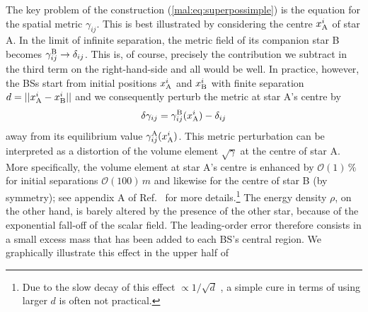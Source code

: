 The key problem of the construction (\ref{mal:eq:superpossimple})
is the equation for the spatial metric $\gamma_{ij}$. This is best
illustrated by considering the centre $x_{\rm A}^i$ of star A.
In the limit of infinite separation, the metric field of its
companion star B becomes $\gamma_{ij}^{\rm B}\rightarrow \delta_{ij}$.
This is, of course, precisely the contribution we subtract in
the third term on the right-hand-side and all would be well.
In practice, however, the BSs start from initial positions
$x_{\rm A}^i$ and $x_{\rm B}^i$ with finite separation
$d=||x_{\rm A}^i-x_{\rm B}^i||$ and we consequently perturb
the metric at star A's centre by
%
\begin{equation}
  \delta \gamma_{ij} = \gamma_{ij}^{\rm B}(x^i_{\rm A})
  -\delta_{ij}
  \label{mal:eq:metricpert}
\end{equation}
%
away from its equilibrium value $\gamma_{ij}^{\rm A}(x_{\rm A}^i)$.
This metric perturbation can be interpreted as a distortion of
the volume element $\sqrt{\gamma}$
at the centre of star A. More specifically, the volume element
at star A's centre is enhanced by $\mathcal{O}(1)\,\%$ for initial
separations $\mathcal{O}(100)\,m$ and likewise for the centre of
star B (by symmetry); see appendix A of Ref.~\cite{Helfer:2018vtq}
for more details.\footnote{Due to the slow decay of this effect $\propto 1/\sqrt{d}$ \cite{Helfer:2018vtq},
a simple cure in terms of using larger $d$ is often not practical.}
The energy density $\rho$, on the other hand, is barely altered by the
presence of the other star, because of the exponential fall-off of
the scalar field. The leading-order error therefore consists in a
small excess mass that has been added to each BS's central region.
We graphically illustrate this effect in the upper half of
%
